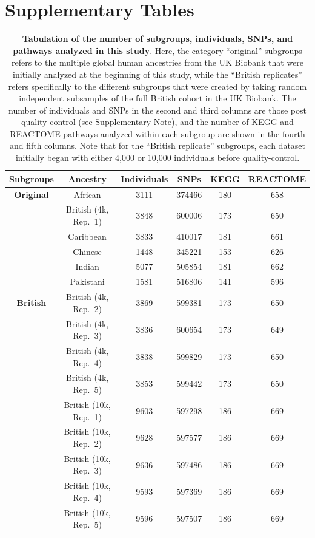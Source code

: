 \documentclass[10pt]{article}
\begin{document}

\clearpage
\newpage

\section{Supplementary Tables}\label{Supplementary-Tables}

\setlength{\extrarowheight}{3pt}

\begin{table}[ht]
\centering
\begin{tabular}{|c|c|c|c|c|c|}
  \hline
\textbf{Subgroups} & \textbf{Ancestry} & \textbf{Individuals} & \textbf{SNPs} & \textbf{KEGG} & \textbf{REACTOME} \\
[2pt]\hline
 \multirow{6.5}{*}{\textbf{Original}} &African & 3111 & 374466 & 180 & 658 \\ [2pt]
& British (4k, Rep.~1) & 3848 & 600006 & 173 & 650 \\ [2pt]
& Caribbean & 3833 & 410017 & 181 & 661 \\ [2pt]
& Chinese & 1448 & 345221 & 153 & 626 \\ [2pt]
& Indian & 5077 & 505854 & 181 & 662 \\ [2pt]
& Pakistani & 1581 & 516806 & 141 & 596 \\ [2pt]\hline
\multirow{9.5}{*}{\textbf{British}} & British (4k, Rep.~2) & 3869 & 599381 & 173 & 650 \\[2pt] 
& British (4k, Rep.~3) & 3836 & 600654 & 173 & 649 \\ [2pt]
& British (4k, Rep.~4) & 3838 & 599829 & 173 & 650 \\ [2pt]
& British (4k, Rep.~5) & 3853 & 599442 & 173 & 650 \\ [2pt]
& British (10k, Rep.~1) & 9603 & 597298 & 186 & 669 \\ [2pt]
& British (10k, Rep.~2) & 9628 & 597577 & 186 & 669 \\ [2pt]
& British (10k, Rep.~3) & 9636 & 597486 & 186 & 669 \\ [2pt]
& British (10k, Rep.~4) & 9593 & 597369 & 186 & 669 \\ [2pt]
& British (10k, Rep.~5) & 9596 & 597507 & 186 & 669 \\ [2pt]
  \hline
\end{tabular}
\caption{\textbf{Tabulation of the number of subgroups, individuals, SNPs, and pathways analyzed in this study}. Here, the category ``original'' subgroups refers to the multiple global human ancestries from the UK Biobank that were initially analyzed at the beginning of this study, while the ``British replicates'' refers specifically to the different subgroups that were created by taking random independent subsamples of the full British cohort in the UK Biobank. The number of individuals and SNPs in the second and third columns are those post quality-control (see Supplementary Note), and the number of KEGG and REACTOME pathways analyzed within each subgroup are shown in the fourth and fifth columns. Note that for the ``British replicate'' subgroups, each dataset initially began with either 4,000 or 10,000 individuals before quality-control.}

\end{table}
\end{document}
